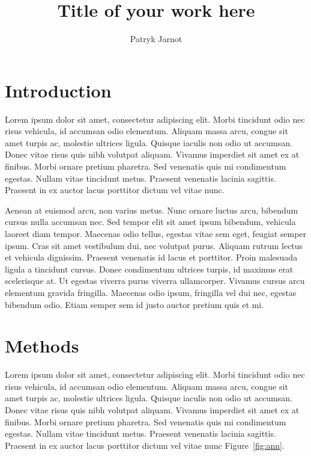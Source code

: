 \documentclass[twocolumn]{miniclass}
\title{Title of your work here}
\author[1,$\ast$]{Patryk Jarnot}
\affil[1]{Department of Computer Network and Systems, Silesian University of Technology}
\affil[$\ast$]{patryk.jarnot@polsl.pl}
\date{}
\begin{document}
\maketitle
\sloppy



\section{Introduction}
Lorem ipsum dolor sit amet, consectetur adipiscing elit. Morbi tincidunt odio nec risus vehicula, id accumsan odio elementum. Aliquam massa arcu, congue sit amet turpis ac, molestie ultrices ligula. Quisque iaculis non odio ut accumsan. Donec vitae risus quis nibh volutpat aliquam. Vivamus imperdiet sit amet ex at finibus. Morbi ornare pretium pharetra. Sed venenatis quis mi condimentum egestas. Nullam vitae tincidunt metus. Praesent venenatis lacinia sagittis. Praesent in ex auctor lacus porttitor dictum vel vitae nunc.

Aenean at euismod arcu, non varius metus. Nunc ornare luctus arcu, bibendum cursus nulla accumsan nec. Sed tempor elit sit amet ipsum bibendum, vehicula laoreet diam tempor. Maecenas odio tellus, egestas vitae sem eget, feugiat semper ipsum. Cras sit amet vestibulum dui, nec volutpat purus. Aliquam rutrum lectus et vehicula dignissim. Praesent venenatis id lacus et porttitor. Proin malesuada ligula a tincidunt cursus. Donec condimentum ultrices turpis, id maximus erat scelerisque at. Ut egestas viverra purus viverra ullamcorper. Vivamus cursus arcu elementum gravida fringilla. Maecenas odio ipsum, fringilla vel dui nec, egestas bibendum odio. Etiam semper sem id justo auctor pretium quis et mi.

\section{Methods}
Lorem ipsum dolor sit amet, consectetur adipiscing elit. Morbi tincidunt odio nec risus vehicula, id accumsan odio elementum. Aliquam massa arcu, congue sit amet turpis ac, molestie ultrices ligula. Quisque iaculis non odio ut accumsan. Donec vitae risus quis nibh volutpat aliquam. Vivamus imperdiet sit amet ex at finibus. Morbi ornare pretium pharetra. Sed venenatis quis mi condimentum egestas. Nullam vitae tincidunt metus. Praesent venenatis lacinia sagittis. Praesent in ex auctor lacus porttitor dictum vel vitae nunc Figure~\ref{fig:ann}.
\end{document}

